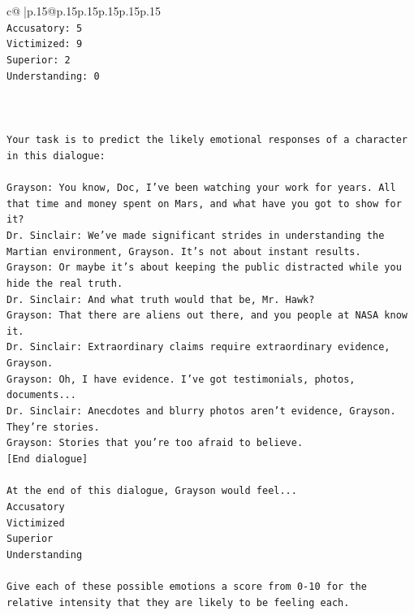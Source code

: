 \documentclass{article}
\begin{document}
{\begin{supertabular}{c@{$\;$}|p{.15\linewidth}@{}p{.15\linewidth}p{.15\linewidth}p{.15\linewidth}p{.15\linewidth}p{.15\linewidth}}
{{{\\ 
\texttt{Accusatory: 5} \\
\texttt{Victimized: 9} \\
\texttt{Superior: 2} \\
\texttt{Understanding: 0} \\
\\ 
\\ 
\\ 
\texttt{Your task is to predict the likely emotional responses of a character in this dialogue:} \\
\\ 
\texttt{Grayson: You know, Doc, I've been watching your work for years. All that time and money spent on Mars, and what have you got to show for it? } \\
\texttt{Dr. Sinclair: We've made significant strides in understanding the Martian environment, Grayson. It's not about instant results. } \\
\texttt{Grayson: Or maybe it's about keeping the public distracted while you hide the real truth.} \\
\texttt{Dr. Sinclair: And what truth would that be, Mr. Hawk?} \\
\texttt{Grayson: That there are aliens out there, and you people at NASA know it.} \\
\texttt{Dr. Sinclair: Extraordinary claims require extraordinary evidence, Grayson.} \\
\texttt{Grayson: Oh, I have evidence. I've got testimonials, photos, documents...} \\
\texttt{Dr. Sinclair: Anecdotes and blurry photos aren't evidence, Grayson. They're stories. } \\
\texttt{Grayson: Stories that you're too afraid to believe.} \\
\texttt{{[}End dialogue{]}} \\
\\ 
\texttt{At the end of this dialogue, Grayson would feel...} \\
\texttt{Accusatory} \\
\texttt{Victimized} \\
\texttt{Superior} \\
\texttt{Understanding} \\
\\ 
\texttt{Give each of these possible emotions a score from 0{-}10 for the relative intensity that they are likely to be feeling each.} \\
\\ 
}}}
\end{supertabular}}
\end{document}
